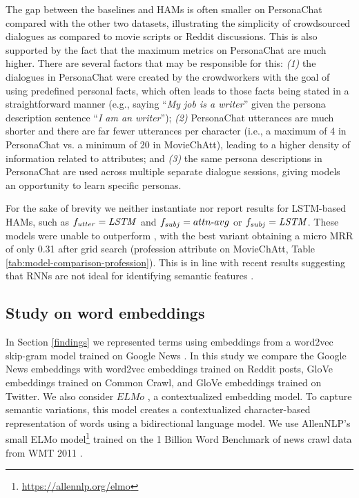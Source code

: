 The gap between the baselines and HAMs is often smaller on PersonaChat compared with the other two datasets, illustrating the simplicity of crowdsourced dialogues as compared to movie scripts or Reddit discussions. This is also supported by the fact that the maximum metrics on PersonaChat are much higher. There are several factors that may be responsible for this: \textit{(1)} the dialogues in PersonaChat were created by the crowdworkers with the goal of using predefined personal facts, which often leads to those facts being stated in a straightforward manner (e.g., saying ``\textit{My job is a writer}'' given the persona description sentence ``\textit{I am an writer}''); \textit{(2)} PersonaChat utterances are much shorter 
and there are far fewer utterances per character (i.e., a maximum of 4 in PersonaChat vs. a minimum of 20 in MovieChAtt), leading to a higher density of information related to attributes; and \textit{(3)} the same persona descriptions in PersonaChat are used across multiple separate dialogue sessions, giving models an opportunity to learn specific personas.

For the sake of brevity we neither instantiate nor report results for LSTM-based HAMs, such as $f_{utter}=\text{\textit{LSTM}}$ and $f_{subj}=attn{\text -}avg$ or $f_{subj}=\text{\textit{LSTM}}$. These models were unable to outperform , with the best variant obtaining a micro MRR of only 0.31 after grid search (profession attribute on MovieChAtt, Table \ref{tab:model-comparison-profession}). This is in line with recent results suggesting that RNNs are not ideal for identifying semantic features \cite{tang2018self}.



\subsection{Study on word embeddings}
In Section \ref{findings} we represented terms using embeddings from a word2vec skip-gram model trained on Google News \cite{embed1}.
In this study we compare the Google News embeddings with word2vec embeddings trained on Reddit posts, GloVe \cite{pennington2014glove} embeddings trained on Common Crawl, and GloVe embeddings trained on Twitter. We also consider $ELMo$ \cite{Peters:2018}, a contextualized embedding model. To capture semantic variations, this model creates a contextualized character-based representation of words using a bidirectional language model. We use AllenNLP's small ELMo model\footnote{\url{https://allennlp.org/elmo}} trained on the 1 Billion Word Benchmark of news crawl data from WMT 2011 \cite{41880}. 


